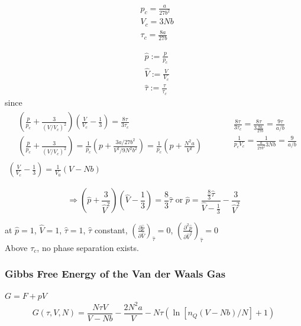 \documentclass[twoside]{amsart}
\theoremstyle{plain}
\theoremstyle{definition}
\begin{document}
\[
\begin{aligned}
  & p_c = \frac{a}{27 b^2} \\ 
  & V_c = 3Nb \\ 
  & \tau_c = \frac{8a}{ 27b}
\end{aligned}
\]

\[
\begin{aligned}
  & \widehat{p} := \frac{p}{p_c} \\ 
  & \widehat{V} := \frac{V}{V_c} \\ 
  & \widehat{\tau} := \frac{ \tau}{ \tau_c}
\end{aligned}
\]
since
\[
\begin{gathered}
\begin{aligned}
  & \left( \frac{p}{p_c} + \frac{3}{ (V/V_c)^2 } \right)\left( \frac{V}{V_c} - \frac{1}{3} \right) = \frac{8 \tau }{ 3\tau_c} \\
  & \left( \frac{p}{p_c} + \frac{3}{ (V/V_c)^2} \right) = \frac{1}{p_c} ( p + \frac{3a/27b^2}{ V^2/9N^2 b^2 } ) = \frac{1}{p_c} ( p + \frac{N^2 a}{V^2} ) 
\end{aligned} \quad \quad \, 
\begin{aligned}
  & \frac{8\tau}{3\tau_c} = \frac{8 \tau}{ 3 \frac{ 8a}{27b} } = \frac{9\tau}{a/b} \\ 
  & \frac{1}{p_c V_c} = \frac{1}{ \frac{a}{27 b^2} 3Nb } = \frac{9}{a/b}
\end{aligned} \\
\left( \frac{V}{V_c} - \frac{1}{3} \right) = \frac{1}{V_0}(V-Nb)
\end{gathered}
\]

\[
\Longrightarrow \left( \widehat{p} + \frac{3}{ \widehat{V}^2 } \right)\left( \widehat{V} - \frac{1}{3} \right) = \frac{8}{3} \widehat{\tau} \text{ or } \widehat{p} = \frac{ \frac{8}{3} \widehat{\tau} }{ \widehat{V} - \frac{1}{3} } - \frac{3}{ \widehat{V}^2}
\]

at $\widehat{p} =1$, $\widehat{V}=1$, $\widehat{\tau}=1$, $\widehat{\tau}$ constant, $\left( \frac{ \partial \widehat{p}}{ \partial \widehat{V}} \right)_{\widehat{\tau}} =0$, $\left( \frac{ \partial^2 \widehat{p}}{ \partial \widehat{V}^2} \right)_{\widehat{\tau}} =0$ \\
Above $\tau_c$, no phase separation exists.  

\subsubsection*{Gibbs Free Energy of the Van der Waals Gas} $G= F+pV$
\[
G(\tau,V,N) = \frac{ N \tau V}{ V - Nb} - \frac{2N^2 a}{V} - N\tau ( \ln{ [n_Q(V-Nb)/N] } + 1)
\]
\end{document}
